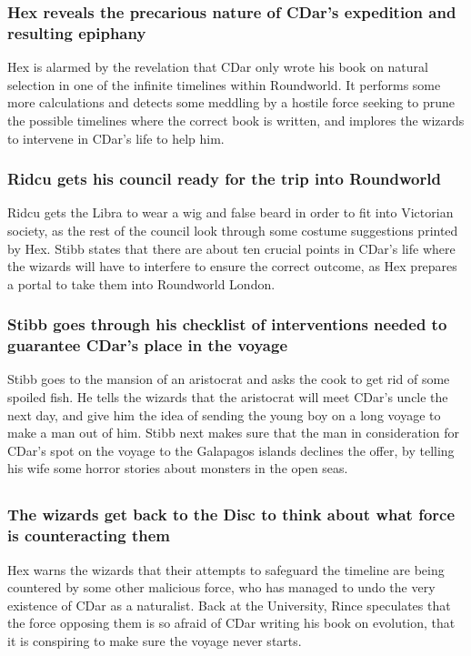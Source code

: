\subsubsection{\Gls{Hex} reveals the precarious nature of \Gls{CDar}'s expedition and resulting
    epiphany}
\Gls{Hex} is alarmed by the revelation that \Gls{CDar} only wrote his book on natural selection in
one of the infinite timelines within Roundworld. It performs some more calculations and detects
some meddling by a hostile force seeking to prune the possible timelines where the correct book is
written, and implores the wizards to intervene in \Gls{CDar}'s life to help him.

\subsubsection{\Gls{Ridcu} gets his council ready for the trip into Roundworld}
\Gls{Ridcu} gets the \Gls{Libra} to wear a wig and false beard in order to fit into Victorian
society, as the rest of the council look through some costume suggestions printed by \Gls{Hex}.
\Gls{Stibb} states that there are about ten crucial points in \Gls{CDar}'s life where the wizards
will have to interfere to ensure the correct outcome, as \Gls{Hex} prepares a portal to take them
into Roundworld London.

\subsubsection{\Gls{Stibb} goes through his checklist of interventions needed to guarantee
    \Gls{CDar}'s place in the voyage}
\Gls{Stibb} goes to the mansion of an aristocrat and asks the cook to get rid of some spoiled fish.
He tells the wizards that the aristocrat will meet \Gls{CDar}'s uncle the next day, and give him the
idea of sending the young boy on a long voyage to make a man out of him. \Gls{Stibb} next makes sure
that the man in consideration for \Gls{CDar}'s spot on the voyage to the Galapagos islands declines
the offer, by telling his wife some horror stories about monsters in the open seas.

\subsection{}
\subsubsection{The wizards get back to the Disc to think about what force is counteracting them}
\Gls{Hex} warns the wizards that their attempts to safeguard the timeline are being countered by
some other malicious force, who has managed to undo the very existence of \Gls{CDar} as a
naturalist. Back at the University, \Gls{Rince} speculates that the force opposing them is so afraid
of \Gls{CDar} writing his book on evolution, that it is conspiring to make sure the voyage never
starts.

